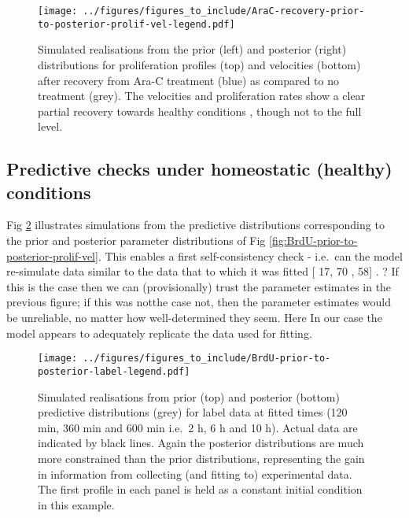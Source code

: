 \documentclass[10pt,letterpaper]{article}
\providecommand{\DIFaddtex}[1]{{\protect\color{blue} \sf #1}} %
\providecommand{\DIFdeltex}[1]{{\protect\color{red} \scriptsize #1}} %
\providecommand{\DIFaddbegin}{} %
\providecommand{\DIFaddend}{} %
\providecommand{\DIFdelbegin}{} %
\providecommand{\DIFdelend}{} %
\providecommand{\DIFaddFL}[1]{\DIFadd{#1}} %
\providecommand{\DIFdelFL}[1]{\DIFdel{#1}} %
\providecommand{\DIFaddbeginFL}{} %
\providecommand{\DIFaddendFL}{} %
\providecommand{\DIFdelbeginFL}{} %
\providecommand{\DIFdelendFL}{} %
\providecommand{\DIFadd}[1]{\texorpdfstring{\DIFaddtex{#1}}{#1}} %
\providecommand{\DIFdel}[1]{\texorpdfstring{\DIFdeltex{#1}}{}} %
\begin{document}
\begin{figure}
\centering
\texttt{[image: ../figures/figures\_to\_include/AraC-recovery-prior-to-posterior-prolif-vel-legend.pdf]}
\caption{Simulated realisations from the prior (left) and posterior
(right) distributions for proliferation profiles (top) and velocities
(bottom) after recovery from Ara-C treatment (blue) as compared to no
treatment (grey). The velocities and proliferation rates show \DIFdelbeginFL \DIFdelFL{a clear
}\DIFdelendFL \DIFaddbeginFL \DIFaddFL{partial
}\DIFaddendFL recovery towards healthy
conditions\DIFdelbeginFL \DIFdelFL{, though not to the full
level}\DIFdelendFL .\label{fig:AraC-recovery-prior-to-posterior-prolif-vel}}
\end{figure}

\subsection{Predictive checks under homeostatic (healthy)
conditions}\label{predictive-checks-under-homeostatic-healthy-conditions}

Fig \ref{fig:BrdU-prior-to-posterior-label} illustrates simulations from
the predictive distributions corresponding to the prior and posterior
parameter distributions of Fig
\ref{fig:BrdU-prior-to-posterior-prolif-vel}. This enables a first
self-consistency check - i.e.~can the model re-simulate data similar to
\DIFdelbegin \DIFdel{the data }\DIFdelend \DIFaddbegin \DIFadd{that }\DIFaddend to which it was fitted {[}\DIFdelbegin \DIFdel{17, 70}\DIFdelend \DIFaddbegin \DIFadd{20, 58}\DIFaddend {]}\DIFdelbegin \DIFdel{. }\DIFdelend \DIFaddbegin \DIFadd{? }\DIFaddend If this is the case then we
can (provisionally) trust the parameter estimates in the previous
figure; if \DIFdelbegin \DIFdel{this was notthe case }\DIFdelend \DIFaddbegin \DIFadd{not, }\DIFaddend then the parameter estimates would be unreliable, no
matter how well-determined they seem. \DIFdelbegin \DIFdel{Here }\DIFdelend \DIFaddbegin \DIFadd{In our case }\DIFaddend the model appears to
adequately replicate the data used for fitting.

\begin{figure}
\centering
\texttt{[image: ../figures/figures\_to\_include/BrdU-prior-to-posterior-label-legend.pdf]}
\caption{Simulated realisations from prior (top) and posterior (bottom)
predictive distributions (grey) for label data at fitted times (120 min,
360 min and 600 min i.e.~2 h, 6 h and 10 h). Actual data are indicated
by black lines. Again the posterior distributions are much more
constrained than the prior distributions, representing the gain in
information from collecting (and fitting to) experimental data. The
first profile in each panel is held as a constant initial condition in
this example.\label{fig:BrdU-prior-to-posterior-label}}
\end{figure}
\end{document}
